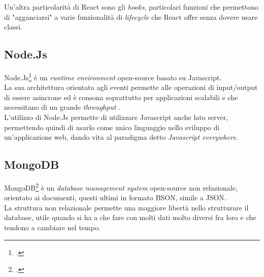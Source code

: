 Un'altra particolarità di React sono gli \emph{hooks}, particolari funzioni che permettono di "agganciarsi" a varie funzionalità di \emph{lifecycle} che React offre senza dovere usare classi.

\subsection{Node.Js}

Node.Js\footcite{site:node.js} è un \emph{runtime environment} open-source basato su Javascript.\\
La sua architettura orientata agli eventi permette alle operazioni di input/output di essere asincrone ed è consona soprattutto per applicazioni scalabili e che necessitano di un grande \emph{throughput} .\\
L'utilizzo di Node.Js permette di utilizzare Javascript anche lato server, permettendo quindi di usarlo come unico linguaggio nello sviluppo di un'applicazione web, dando vita al paradigma detto \emph{Javascript everywhere}.\\

\subsection{MongoDB}

MongoDB\footcite{site:mongo} è un \emph{database management system} open-source non relazionale, orientato ai documenti, questi ultimi in formato BSON, simile a JSON.\\
La struttura non relazionale permette una maggiore libertà nello strutturare il database, utile quando si ha a che fare con molti dati molto diversi fra loro e che tendono a cambiare nel tempo.